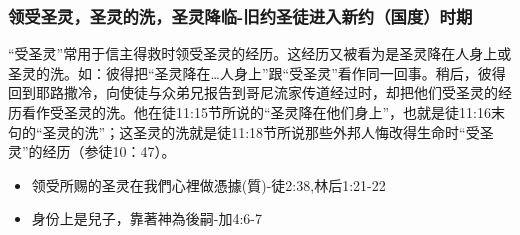 \subsubsection{领受圣灵，圣灵的洗，圣灵降临-旧约圣徒进入新约（国度）时期}
“受圣灵”常用于信主得救时领受圣灵的经历。这经历又被看为是圣灵降在人身上或圣灵的洗。如：彼得把“圣灵降在…人身上”跟“受圣灵”看作同一回事。稍后，彼得回到耶路撒冷，向使徒与众弟兄报告到哥尼流家传道经过时，却把他们受圣灵的经历看作受圣灵的洗。他在徒11:15节所说的“圣灵降在他们身上”，也就是徒11:16末句的“圣灵的洗”；这圣灵的洗就是徒11:18节所说那些外邦人悔改得生命时“受圣灵”的经历（参徒10：47）。
\begin{itemize}
\item 领受所赐的圣灵在我們心裡做憑據(質)-徒2:38,林后1:21-22
\item 身份上是兒子，靠著神為後嗣-加4:6-7
\end{itemize}

